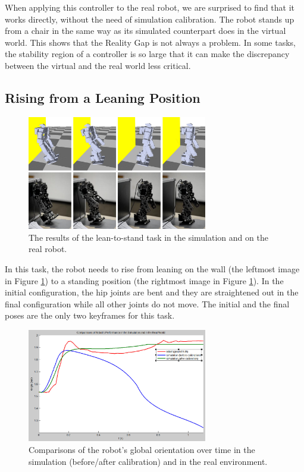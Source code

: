 When applying this controller to the real robot, we are surprised to find that it works directly, without the need of simulation calibration. The robot stands up from a chair in the same way as its simulated counterpart does in the virtual world. This shows that the Reality Gap is not always a problem. In some tasks, the stability region of a controller is so large that it can make the discrepancy between the virtual and the real world less critical.

\subsection{Rising from a Leaning Position}

\begin{figure}[!t]
  \centering
  \includegraphics[width=0.7\textwidth]{figures/lean2Stand}
  \caption{The results of the lean-to-stand task in the simulation and on the real robot.}
  \label{fig:lean2Stand}
\end{figure}

In this task, the robot needs to rise from leaning on the wall (the leftmost image in Figure \ref{fig:lean2Stand}) to a standing position (the rightmost image in Figure \ref{fig:lean2Stand}). In the initial configuration, the hip joints are bent and they are straightened out in the final configuration while all other joints do not move. The initial and the final poses are the only two keyframes for this task.

\begin{figure}[!t]
  \centering
  \includegraphics[width=0.7\textwidth]{figures/simRobotCompare}
  \caption{Comparisons of the robot's global orientation over time in the simulation (before/after calibration) and in the real environment.}
  \label{fig:simRobotCompare}
\end{figure}


